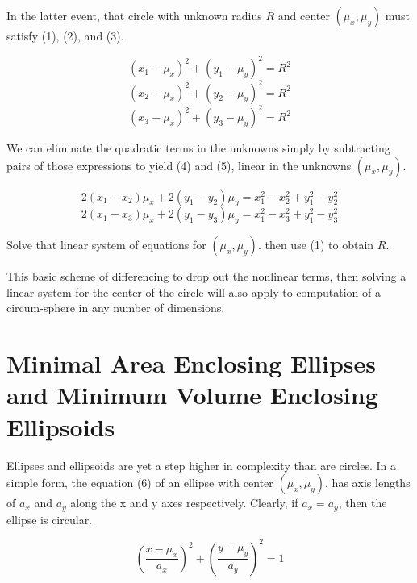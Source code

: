 \documentclass[a4paper,11pt]{article}
\begin{document}
In the latter event, that circle with unknown radius $R$ and center $(\mu_x,\mu_y)$ must
satisfy (1), (2), and (3).

\begin{equation} \tag{1}
   (x_1 - \mu_x)^2 + (y_1 - \mu_y)^2 = R^2
\end{equation}
\begin{equation} \tag{2}
   (x_2 - \mu_x)^2 + (y_2 - \mu_y)^2 = R^2
\end{equation}
\begin{equation} \tag{3}
   (x_3 - \mu_x)^2 + (y_3 - \mu_y)^2 = R^2
\end{equation}

We can eliminate the quadratic terms in the unknowns simply by subtracting pairs of 
those expressions to yield (4) and (5), linear in the unknowns $(\mu_x,\mu_y)$.

\begin{equation} \tag{4}
   2(x_1 - x_2)\mu_x + 2(y_1 - y_2)\mu_y = x_1^2 - x_2^2 + y_1^2 - y_2^2  
\end{equation}
\begin{equation} \tag{5}
   2(x_1 - x_3)\mu_x + 2(y_1 - y_3)\mu_y = x_1^2 - x_3^2 + y_1^2 - y_3^2  
\end{equation}

Solve that linear system of equations for $(\mu_x,\mu_y)$. then use (1) to obtain $R$.

This basic scheme of differencing to drop out the nonlinear terms, then solving a linear
system for the center of the circle will also apply to computation of a circum-sphere in
any number of dimensions.

\bigskip


\bigskip

\section{Minimal Area Enclosing Ellipses and Minimum Volume Enclosing Ellipsoids}

Ellipses and ellipsoids are yet a step higher in complexity than are circles. In a simple form,
the equation (6) of an ellipse with center $(\mu_x,\mu_y)$, has axis lengths of $a_x$ and $a_y$
along the x and y axes respectively. Clearly, if $a_x = a_y$, then the ellipse is circular.

\begin{equation} \tag{6}
(\frac{x-\mu_x}{a_x})^2 + (\frac{y - \mu_y}{a_y})^2 = 1
\end{equation}
\end{document}
